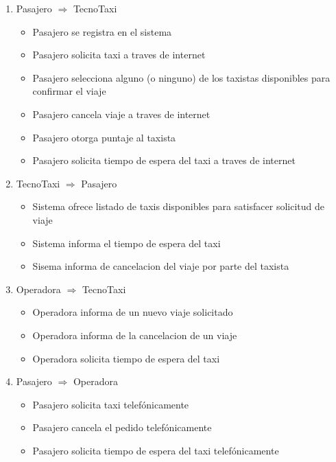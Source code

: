 \begin{enumerate}

\item Pasajero $\Rightarrow$ TecnoTaxi

\begin{itemize}

\item Pasajero se registra en el sistema
\item Pasajero solicita taxi a traves de internet
\item Pasajero selecciona alguno (o ninguno) de los taxistas disponibles para confirmar el viaje
\item Pasajero cancela viaje a traves de internet
\item Pasajero otorga puntaje al taxista
\item Pasajero solicita tiempo de espera del taxi a traves de internet

\end{itemize}

\item TecnoTaxi $\Rightarrow$ Pasajero

\begin{itemize}
\item Sistema ofrece listado de taxis disponibles para satisfacer solicitud de viaje
\item Sistema informa el tiempo de espera del taxi 
\item Sisema informa de cancelacion del viaje por parte del taxista
\end{itemize}

\item Operadora $\Rightarrow$ TecnoTaxi

\begin{itemize}
\item Operadora informa de un nuevo viaje solicitado
\item Operadora informa de la cancelacion de un viaje
\item Operadora solicita tiempo de espera del taxi
\end{itemize}

\item Pasajero $\Rightarrow$ Operadora

\begin{itemize}
 \item Pasajero solicita taxi telef\'onicamente
 \item Pasajero cancela el pedido telef\'onicamente
 \item Pasajero solicita tiempo de espera del taxi telef\'onicamente
\end{itemize}


\end{enumerate}
